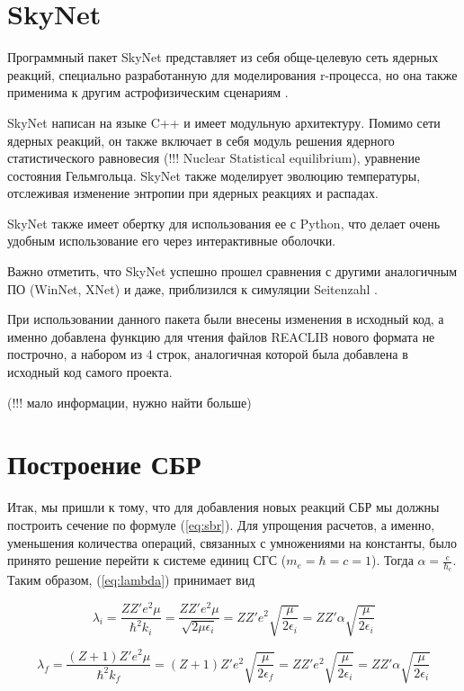 \documentclass[%
master,    %
natbib,      %
subf,        %
href,        %
colorlinks,  %
]{disser}
\begin{document}
\section{SkyNet}

Программный пакет SkyNet представляет из себя обще-целевую сеть ядерных реакций, специально разработанную для моделирования r-процесса, но она также применима к другим астрофизическим сценариям \cite{skynet}.

SkyNet написан на языке C++ и имеет модульную архитектуру. Помимо сети ядерных реакций, он также включает в себя модуль решения ядерного статистического равновесия (!!! Nuclear Statistical equilibrium), уравнение состояния Гельмгольца. SkyNet также моделирует эволюцию температуры, отслеживая изменение энтропии при ядерных реакциях и распадах.

SkyNet также имеет обертку для использования ее с Python, что делает очень удобным использование его через интерактивные оболочки.

Важно отметить, что SkyNet успешно прошел сравнения с другими аналогичным ПО (WinNet, XNet) и даже, приблизился к симуляции Seitenzahl \cite{simulation}.

При использовании данного пакета были внесены изменения в исходный код, а именно добавлена функцию для чтения файлов REACLIB нового формата не построчно, а набором из 4 строк, аналогичная которой была добавлена в исходный код самого проекта.

(!!! мало информации, нужно найти больше)

\section{Построение СБР}

Итак, мы пришли к тому, что для добавления новых реакций СБР мы должны построить сечение по формуле (\ref{eq:sbr}). Для упрощения расчетов, а именно, уменьшения количества операций, связанных с умножениями на константы, было принято решение перейти к системе единиц СГС ($m_e = \hbar = c = 1$). Тогда $\alpha = \frac{e}{\hbar_c}$. Таким образом, (\ref{eq:lambda}) принимает вид

\begin{equation}
\lambda_i = \frac{Z Z' e^2 \mu}{\hbar^2 k_i} = \frac{Z Z' e^2 \mu}{\sqrt{2\mu \epsilon_i}} = Z Z' e^2 \sqrt{\frac{\mu}{2 \epsilon_i}} = Z Z' \alpha \sqrt{\frac{\mu}{2 \epsilon_i}}
\end{equation}

\begin{equation}
\lambda_f = \frac{(Z+1) Z'  e^2 \mu}{\hbar^2 k_f} = (Z + 1)Z' e^2 \sqrt{\frac{\mu}{2 \epsilon_f}} = Z Z' e^2 \sqrt{\frac{\mu}{2 \epsilon_i}} = Z Z' \alpha \sqrt{\frac{\mu}{2 \epsilon_i}}
\end{equation}
\end{document}
